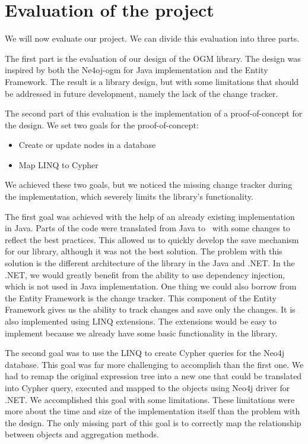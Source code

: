 \chapter{Evaluation of the project}

We will now evaluate our project. We can divide this evaluation into three parts.

The first part is the evaluation of our design of the OGM library. The design was inspired by both the Ne4oj-\acrshort{ogm} for Java implementation and the Entity Framework.
The result is a library design, but with some limitations that should be addressed in future development, namely the lack of the change tracker.

The second part of this evaluation is the implementation of a proof-of-concept for the design.
We set two goals for the proof-of-concept:
\begin{itemize}
    \item {Create or update nodes in a database}
    \item {Map LINQ to Cypher}
\end{itemize}
We achieved these two goals, but we noticed the missing change tracker during the implementation, which severely limits the library's functionality.

The first goal was achieved with the help of an already existing implementation in Java. Parts of the code were translated from Java to \CS\ with some changes to reflect the best practices.
This allowed us to quickly develop the save mechanism for our library, although it was not the best solution.
The problem with this solution is the different architecture of the library in the Java and .NET.
In the .NET, we would greatly benefit from the ability to use dependency injection, which is not used in Java implementation.
One thing we could also borrow from the Entity Framework is the change tracker. This component of the Entity Framework gives us the ability to track changes and save only the changes. It is also implemented using LINQ extensions.
The extensions would be easy to implement because we already have some basic functionality in the library.

The second goal was to use the LINQ to create Cypher queries for the Neo4j database.
This goal was far more challenging to accomplish than the first one.
We had to remap the original expression tree into a new one that could be translated into Cypher query, executed and mapped to the objects using Neo4j driver for .NET.
We accomplished this goal with some limitations. These limitations were more about the time and size of the implementation itself than the problem with the design.
The only missing part of this goal is to correctly map the relationship between objects and aggregation methods.

